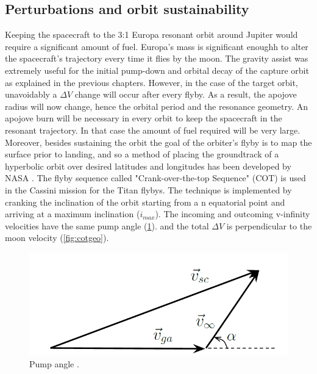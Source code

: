 \subsection{Perturbations and orbit sustainability}
Keeping the spacecraft to the 3:1 Europa resonant orbit around Jupiter would require a significant amount of fuel. Europa's mass is significant enoughh to alter the spacecraft's trajectory every time it flies by the moon. The gravity assist was extremely useful for the initial pump-down and orbital decay of the capture orbit as explained in the previous chapters. However, in the case of the target orbit, unavoidably a $\Delta V$ change will occur after every flyby. As a result, the apojove radius will now change, hence the orbital period and the resonance geometry. An apojove burn will be necessary in every orbit to keep the spacecraft in the resonant trajectory. In that case the amount of fuel required will be very large. Moreover, besides sustaining the orbit the goal of the orbiter's flyby is to map the surface prior to landing, and so a method of placing the groundtrack of a hyperbolic orbit over desired latitudes and longitudes has been developed by NASA \cite{cotseq}. 
The flyby sequence called "Crank-over-the-top Sequence" (COT) is used in the Cassini mission for the Titan flybys. The technique is implemented by cranking the inclination of the orbit starting from a n equatorial point and arriving at a maximum inclination ($i_{max}$). The incoming and outcoming v-infinity velocities have the same pump angle (\ref{fig:pump_a}).
and the total $\Delta V$ is perpendicular to the moon velocity (\ref{fig:cotgeo}). 

\begin{figure}[htb!]
\centering
\includegraphics[scale=0.6]{figures/Orbiter/pumpa.png}
\caption{Pump angle \cite{cotseq}.} 
\label{fig:pump_a}
\end{figure}

